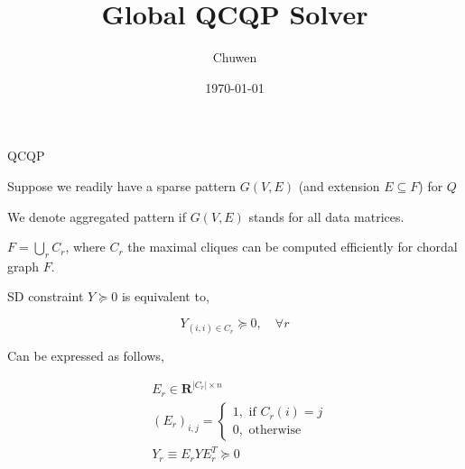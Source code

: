
\usepackage{subfig}
\usepackage[style=authoryear]{biblatex}
\usepackage{bm}
\title{Global QCQP Solver}
\author{Chuwen}
\date{\today}




\fontsize{9pt}{11}\selectfont
\frame{\titlepage}



\begin{frame}{QCQP}

  Suppose we readily have a sparse pattern \(G(V, E)\) (and extension \(E\subseteq F\)) for \(Q\)

  We denote aggregated pattern if \(G(V, E)\) stands for all data matrices.

  \(F = \bigcup_r C_r\), where \(C_r\) the maximal cliques can be computed efficiently for chordal graph \(F\).

  SD constraint \(Y \succeq 0\) is equivalent to,

  \[Y_{(i, i) \in C_r} \succeq 0, \quad \forall r\]

  Can be expressed as follows,

  \begin{equation}
    \begin{aligned}
       & E_r \in \mathbf R^{|C_r|\times n}     \\
       & (E_r)_{i,j}=\begin{cases}
        1,  \text { if } C_r(i)=j \\
        0,  \text { otherwise }
      \end{cases} \\
       & Y_r\equiv E_r Y E_r^T \succeq 0       \\
    \end{aligned}
  \end{equation}
\end{frame}


